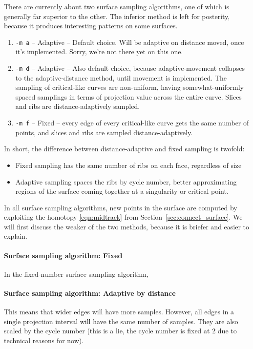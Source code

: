 There are currently about two surface sampling algorithms, one of which is generally far superior to the other.  The inferior method is left for posterity, because it produces interesting patterns on some surfaces.  

\begin{enumerate}
\item {\tt -m a} – Adaptive – Default choice.  Will be adaptive on distance moved, once it's implemented.  Sorry, we're not there yet on this one.
\item {\tt -m d} – Adaptive – Also default choice, because adaptive-movement collapses to the adaptive-distance method, until movement is implemented.  The sampling of critical-like curves are non-uniform, having somewhat-uniformly spaced samplings in terms of projection value across the entire curve.  Slices and ribs are distance-adaptively sampled.
\item {\tt -m f} – Fixed – every edge of every critical-like curve gets the same number of points, and slices and ribs are sampled distance-adaptively.
\end{enumerate}

In short, the difference between distance-adaptive and fixed sampling is twofold:
\begin{itemize}

  \item Fixed sampling has the same number of ribs on each face, regardless of size

  \item Adaptive sampling spaces the ribs by cycle number, better approximating regions of the surface coming together at a singularity or critical point.

\end{itemize}


In all surface sampling algorithms, new points in the surface are computed by exploiting the homotopy \eqref{eqn:midtrack} from Section~\ref{sec:connect_surface}.  We will first discuss the weaker of the two methods, because it is briefer and easier to explain.

\paragraph{Surface sampling algorithm: Fixed}

In the fixed-number surface sampling algorithm, 


\paragraph{Surface sampling algorithm: Adaptive by distance}

 This means that wider edges will have more samples.  However, all edges in a single projection interval will have the same number of samples.  They are also scaled by the cycle number (this is a lie, the cycle number is fixed at 2 due to technical reasons for now).


